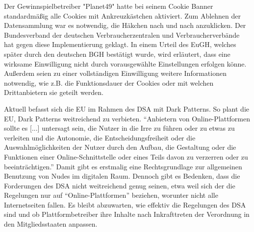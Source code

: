 Der Gewinnspielbetreiber "Planet49" hatte bei seinem Cookie Banner standardmäßig alle Cookies mit Ankreuzkästchen aktiviert. Zum Ablehnen der Datensammlung war es notwendig, die Häkchen nach und nach anzuklicken. Der Bundesverband der deutschen Verbraucherzentralen und Verbraucherverbände hat gegen diese Implementierung geklagt. In einem Urteil des \ac{EuGH}, welches später durch den deutschen \ac{BGH} bestätigt wurde, wird erläutert, dass eine wirksame Einwilligung nicht durch vorausgewählte Einstellungen erfolgen könne. Außerdem seien zu einer vollständigen Einwilligung weitere Informationen notwendig, wie z.B. die Funktionsdauer der Cookies oder mit welchen Drittanbietern sie geteilt werden. 

Aktuell befasst sich die \ac{EU} im Rahmen des \ac{DSA} mit Dark Patterns. So plant die \ac{EU}, Dark Patterns weitreichend zu verbieten. ``Anbietern von Online-Plattformen sollte es [...] untersagt sein, die Nutzer in die Irre zu führen oder zu etwas zu verleiten und die Autonomie, die Entscheidungsfreiheit oder die Auswahlmöglichkeiten der Nutzer durch den Aufbau, die Gestaltung oder die Funktionen einer Online-Schnittstelle oder eines Teils davon zu verzerren oder zu beeinträchtigen.''  Damit gibt es erstmalig eine Rechtsgrundlage zur allgemeinen Benutzung von Nudes im digitalen Raum. Dennoch gibt es Bedenken, dass die Forderungen des \ac{DSA} nicht weitreichend genug seinen, etwa weil sich der die Regelungen nur auf ``Online-Plattformen'' beziehen, worunter nicht alle Internetseiten fallen.  Es bleibt abzuwarten, wie effektiv die Regelungen des \ac{DSA} sind und ob Plattformbetreiber ihre Inhalte nach Inkrafttreten der Verordnung in den Mitgliedsstaaten anpassen.
